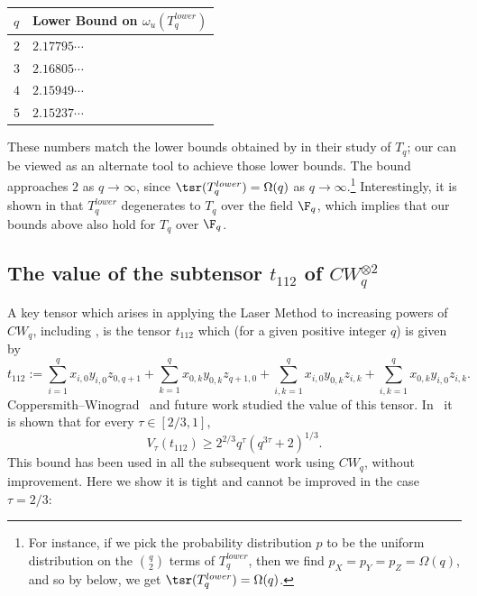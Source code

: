\documentclass{toc}
\begin{document}
\begin{center}
\begin{tabular}{l|l}
$q$ & Lower Bound on $\omega_u(T_q^{lower})$ \\ \hline
$2$                                & $2.17795\cdots$                                                        \\
$3$                                & $2.16805\cdots$                                                        \\
$4$                                & $2.15949\cdots$                                                        \\
$5$                                & $2.15237\cdots$                                                     
\end{tabular}
\end{center}

These numbers match the lower bounds obtained by \cite{almanitcs, blasiak} in their study of $T_q$; our  can be viewed as an alternate tool to achieve those lower bounds. The bound approaches $2$ as $q \to \infty$, since $\tsr(T_q^{lower}) = \Omega(q)$ as $q \to \infty$.\footnote{For instance, if we pick the probability distribution $p$ to be the uniform distribution on the $\binom{q}{2}$ terms of $T_q^{lower}$, then we find $p_X=p_Y=p_Z = \Omega(q)$, and so by  below, we get $\tsr(T_q^{lower}) = \Omega(q)$.}  Interestingly, it is shown in \cite[Theorem~4.16]{quantum} that $T_q^{lower}$ degenerates to $T_q$ over the field $\F_q$, which implies that our bounds above also hold for $T_q$ over $\F_q$.

%
\subsection{The value of the subtensor $t_{112}$ of $CW_q^{\otimes 2}$} \label{t112}

A key tensor which arises in applying the Laser Method to increasing powers of $CW_q$,
%
including \cite{coppersmith, v12,legall,awrefined,legallrect, legallrect2}, 
is the tensor $t_{112}$ which (for a given positive integer $q$) is given by
\[
  t_{112} := \sum_{i=1}^q x_{i,0} y_{i,0} z_{0,q+1} + \sum_{k=1}^q x_{0,k} y_{0,k} z_{q+1,0} + \sum_{i,k=1}^q x_{i,0} y_{0,k} z_{i,k} + \sum_{i,k = 1}^q x_{0,k} y_{i,0} z_{i,k}.
\]
Coppersmith--Winograd~\cite{coppersmith} and future work studied the value of this tensor. In~\cite{coppersmith} it is shown that for every $\tau \in [2/3, 1]$,
\[
  V_\tau(t_{112}) \geq 2^{2/3} q^\tau (q^{3\tau} + 2)^{1/3}.
\]
This bound has been used in all the subsequent work using $CW_q$, without improvement. Here we show it is tight and cannot be improved in the case $\tau=2/3$:
\end{document}
